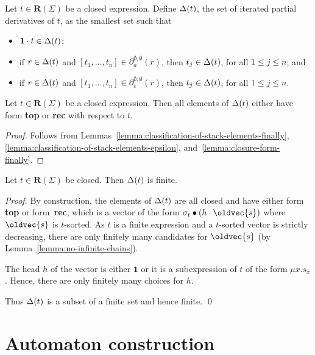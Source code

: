 \documentclass[runningheads, envcountsame, a4paper]{llncs}
\let\vec\oldvec
\newcommand\IPD{\ensuremath\Delta}
\newcommand\pderiv[3][{}]{\partial^{#1}_{#3}(#2)}
\newcommand\Rempty{\mathbf1}
\newcommand\Reg{\mathbf{R}}
\newcommand\ApplySubst[2]{#1 \bullet #2} %
\begin{document}
\begin{definition}
  Let $t \in \Reg (\Sigma)$ be a closed expression.
  Define $\IPD(t)$, the set of iterated partial derivatives of $t$, as the smallest set such that
  \begin{itemize}
  \item $\Rempty \cdot t \in \IPD (t)$;
  \item if $r \in \IPD (t)$ and  $[t_1,\dots, t_n] \in \pderiv[\emptyset,\emptyset]{r}a$,
    then $t_j \in \IPD(t)$, for all $1\le j\le n$; and
  \item if $r \in \IPD (t)$ and  $[t_1,\dots, t_n] \in \pderiv[\emptyset,\emptyset]{r}\varepsilon$,
    then $t_j \in \IPD(t)$, for all $1\le j\le n$.
  \end{itemize}
\end{definition}
\begin{lemma}[Closure]
  Let $t \in \Reg (\Sigma)$ be a closed expression.
  Then all elements of $\IPD(t)$ either have form \textup{\textbf{top}} or \textup{\textbf{rec}} with respect to $t$. 
\end{lemma}
\begin{proof}
  Follows from
  Lemmas~\ref{lemma:classification-of-stack-elements-finally},
  \ref{lemma:classification-of-stack-elements-epsilon},
  and~\ref{lemma:closure-form-finally}. 
\end{proof}

\begin{lemma}[Finiteness]\label{lemma:finiteness}
  Let $t \in \Reg (\Sigma)$ be closed.
  Then $\IPD (t)$ is finite.
\end{lemma}
\begin{proof}
  By construction, the elements of $\IPD (t)$ are all closed and have
  either form \textbf{top} or form~\textbf{rec}, which is a vector of
  the form $\ApplySubst{\sigma_t}{( h\cdot \vec{s})}$ where $\vec{s}$
  is $t$-sorted. As $t$ is a finite expression and a $t$-sorted vector
  is strictly decreasing, there are only finitely many candidates for
  $\vec{s}$ (by Lemma~\ref{lemma:no-infinite-chains}).

  The head $h$ of the vector is either $\Rempty$ or it is a subexpression of
  $t$ of the form $\mu x.s_x$. Hence, there are only finitely many
  choices for $h$. 

  Thus $\IPD (t)$ is a subset of a finite set and hence finite.
  \qed
\end{proof}
\section{Automaton construction}
\label{sec:automaton-construction}
\end{document}
